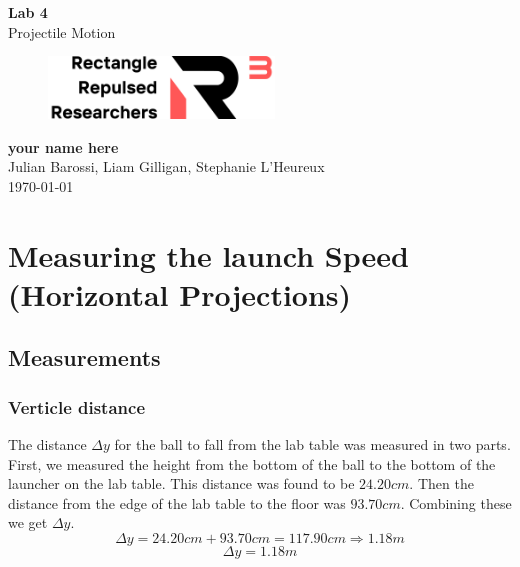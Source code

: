 \documentclass[11pt, letterpaper, includehead]{article}
\begin{document}
\begin{titlepage}
  \begin{center}
    \Huge{\textbf{Lab 4}}\\
    \Huge{Projectile Motion}
    \vfill
    \begin{figure}[H] %
      \centering 
      \includegraphics[width=6cm]{../logo.png}
    \end{figure}
    \large{\textbf{your name here}}\\
    \large{Julian Barossi, Liam Gilligan, Stephanie L'Heureux}\\
    \vspace{0.5cm}
    \normalsize
    \today
  \end{center}
\end{titlepage}

\tableofcontents
\pagebreak %

\pagestyle{fancy}
\fancyhead{}

\section{Measuring the launch Speed (Horizontal Projections)} %

\subsection{Measurements} %

\subsubsection{Verticle distance} %
The distance $\Delta y$ for the ball to fall from the lab table was measured in two parts. 
First, we measured the height from the bottom of the ball to the bottom of the launcher on the lab table.
This distance was found to be $24.20cm$. Then the distance from the edge of the lab table to the 
floor was $93.70cm$. Combining these we get $\Delta y$.
$$\Delta y = 24.20cm + 93.70cm = 117.90cm \Rightarrow 1.18m$$ 
$$\boxed{\Delta y = 1.18m}$$ 
\end{document}
